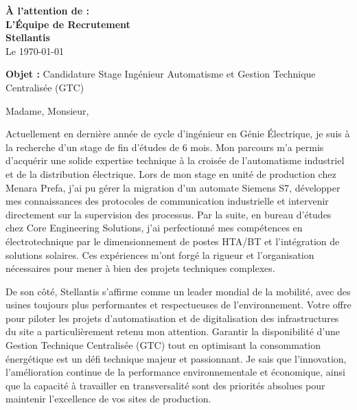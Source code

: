 \documentclass[10pt,a4paper]{altacv}
\makeatletter
\renewcommand{\makecvheader}{%
  \begingroup
    \raggedright\color{emphasis}%
    {\Huge\bfseries\MakeUppercase{\@name}\par}
    \medskip
    {\large\bfseries\color{accent}\@tagline\par}
    \medskip
    {\footnotesize\bfseries\@personalinfo\par}
  \endgroup\medskip
}
\makeatother
\begin{document}

\makecvheader

\bigskip

\begin{flushright}
  {\color{emphasis}\textbf{À l'attention de :}} \\[2pt]
  \textbf{L'Équipe de Recrutement} \\
  \textbf{Stellantis} \\[20pt]
  Le \today
\end{flushright}
\bigskip

\bigskip

{\color{accent}\textbf{Objet :}} Candidature Stage Ingénieur Automatisme et Gestion Technique Centralisée (GTC)

\bigskip\bigskip

Madame, Monsieur,

\vspace{0.4cm}

Actuellement en dernière année de cycle d'ingénieur en Génie Électrique, je suis à la recherche d'un stage de fin d'études de 6 mois. Mon parcours m'a permis d'acquérir une solide expertise technique à la croisée de l'automatisme industriel et de la distribution électrique. Lors de mon stage en unité de production chez Menara Prefa, j'ai pu gérer la migration d'un automate Siemens S7, développer mes connaissances des protocoles de communication industrielle et intervenir directement sur la supervision des processus. Par la suite, en bureau d'études chez Core Engineering Solutions, j'ai perfectionné mes compétences en électrotechnique par le dimensionnement de postes HTA/BT et l'intégration de solutions solaires. Ces expériences m'ont forgé la rigueur et l'organisation nécessaires pour mener à bien des projets techniques complexes.

\vspace{0.4cm}

De son côté, Stellantis s'affirme comme un leader mondial de la mobilité, avec des usines toujours plus performantes et respectueuses de l'environnement. Votre offre pour piloter les projets d'automatisation et de digitalisation des infrastructures du site a particulièrement retenu mon attention. Garantir la disponibilité d'une Gestion Technique Centralisée (GTC) tout en optimisant la consommation énergétique est un défi technique majeur et passionnant. Je sais que l'innovation, l'amélioration continue de la performance environnementale et économique, ainsi que la capacité à travailler en transversalité sont des priorités absolues pour maintenir l'excellence de vos sites de production.
\end{document}
